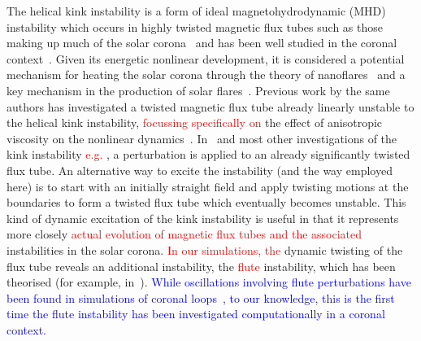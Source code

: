 \documentclass[12pt]{article}
\newcommand{\rs}[2]{\textcolor{red}{#2}}
\newcommand{\jq}[2]{\textcolor{blue}{#2}}
\begin{document}
The helical kink instability is a form of ideal magnetohydrodynamic
(MHD) instability which occurs in highly twisted magnetic flux tubes
such as those making up much of the solar
corona~\cite{realeCoronalLoopsObservations2014} and has been well
studied in the coronal
context~\cite{hoodKinkInstabilitySolar1979,hoodCoronalHeatingMagnetic2009,browningSolarCoronalHeating2003b,barefordShockHeatingNumerical2015,quinnEffectAnisotropicViscosity2020}. Given
its energetic nonlinear development, it is considered a potential
mechanism for heating the solar corona through the theory of
nanoflares~\cite{klimchukSolvingCoronalHeating2006,browningMechanismsSolarCoronal1991}
and a key mechanism in the production of solar
flares~\cite{hoodKinkInstabilitySolar1979}. Previous work by the same
authors has investigated a twisted magnetic flux tube already linearly
unstable to the helical kink instability, \rs{investigating particularly}{focussing specifically on}
the effect of anisotropic viscosity on the nonlinear
dynamics~\cite{quinnEffectAnisotropicViscosity2020}. In~\cite{quinnEffectAnisotropicViscosity2020}
and most other investigations of the kink instability
\rs{}{e.g. \cite{hoodCoronalHeatingMagnetic2009}}, a perturbation 
is applied to an already significantly twisted flux tube. An
alternative way to excite the instability (and the way employed here)
is to start with an initially straight field and apply twisting
motions at the boundaries to form a twisted flux tube which eventually
becomes unstable. This kind of dynamic excitation of the kink
instability is useful in that it represents more closely \rs{the real
development of a magnetic flux tube and associated}{actual evolution
  of magnetic flux tubes and the associated} instabilities in 
the solar corona. \rs{The}{In our simulations, the}
dynamic twisting of the flux tube reveals an additional instability,
the \rs{fluting}{flute} instability, which has been theorised (for example,
in~\cite{priestMagnetohydrodynamicsSuna}). \jq{}{While oscillations involving flute perturbations have been found in simulations of coronal loops~\cite{terradasEffectMagneticTwist2018}, to our knowledge, this is the first time the flute instability has been investigated computationally in a coronal context.}
\end{document}
